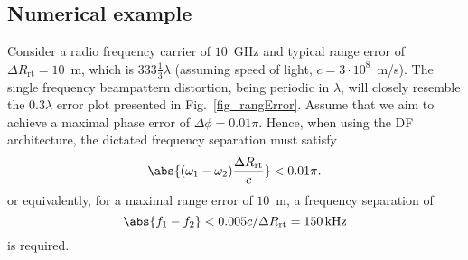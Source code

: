 \subsection*{Numerical example}
Consider a radio frequency carrier of $10$~GHz and typical range error of $\Delta{}R_{\text{rt}}=10$~m, which is $333\frac{1}{3}\lambda$ (assuming  speed of light, $c=3\cdot 10^{8}$~m/s). The single frequency beampattern distortion, being periodic in $\lambda$, will closely resemble the $0.3\lambda$ error plot presented in Fig.~\ref{fig_rangError}. Assume that we aim to achieve a maximal phase error of $\Delta \phi=0.01\pi$. Hence, when using the DF architecture, the dictated frequency separation must satisfy
\begin{equation}\label{eq_DF_phErr}
\abs{(\omega_1-\omega_2)\frac{\Delta{}R_{\text{rt}}}{c}}<0.01\pi.
\end{equation}
or equivalently, for a maximal range error of $10$~m, a frequency separation of
\[
\abs{f_1-f_2}<0.005 c/\Delta{}R_{\text{rt}}=150 \,\text{kHz}
\]
is required. 

